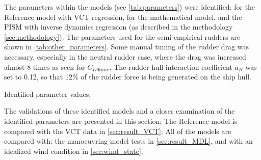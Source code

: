 The parameters within the models (see \autoref{tab:parameters}) were identified: for the Reference model with VCT regression, for the mathematical model, and the PISM with inverse dynamics regression (as described in the methodology \autoref{sec:methodology}). 
The parameters used for the semi-empirical rudders are shown in \autoref{tab:other_parameters}. Some manual tuning of the rudder drag was necessary, especially in the neutral rudder case, where the drag was increased almost 8 times as seen for $C_{D0tune}$. The rudder hull interaction coefficient $a_H$ was set to 0.12, so that 12\% of the rudder force is being generated on the ship hull.
\begin{table}[h]
    \centering
    \caption{Identified parameter values.}
    \label{tab:parameters}
\end{table}

The validations of these identified models and a closer examination of the identified parameters are presented in this section; The Reference model is compared with the VCT data in \autoref{sec:result_VCT}; All of the models are compared with: the manoeuvring model tests in \autoref{sec:result_MDL}, and with an idealized wind condition in \autoref{sec:wind_state}.